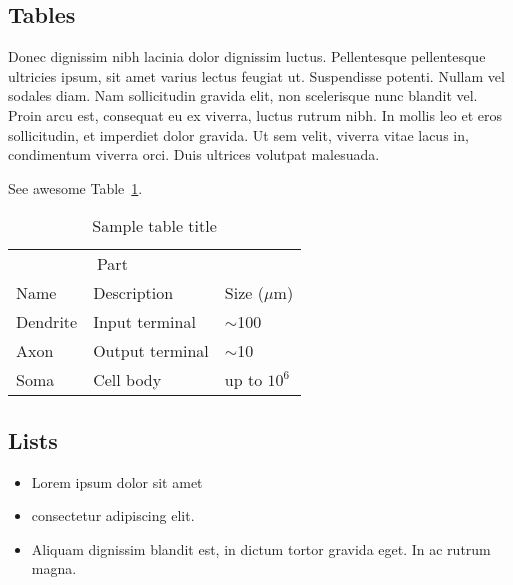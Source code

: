\documentclass{article}
\begin{document}
\subsection{Tables}
Donec dignissim nibh lacinia dolor dignissim luctus. Pellentesque pellentesque ultricies ipsum, sit amet varius lectus feugiat ut. Suspendisse potenti. Nullam vel sodales diam. Nam sollicitudin gravida elit, non scelerisque nunc blandit vel. Proin arcu est, consequat eu ex viverra, luctus rutrum nibh. In mollis leo et eros sollicitudin, et imperdiet dolor gravida. Ut sem velit, viverra vitae lacus in, condimentum viverra orci. Duis ultrices volutpat malesuada. 


See awesome Table~\ref{tab:table}.

\begin{table}
 \caption{Sample table title}
  \centering
  \begin{tabular}{lll}
    \toprule
    \multicolumn{2}{c}{Part}                   \\
    \cmidrule(r){1-2}
    Name     & Description     & Size ($\mu$m) \\
    \midrule
    Dendrite & Input terminal  & $\sim$100     \\
    Axon     & Output terminal & $\sim$10      \\
    Soma     & Cell body       & up to $10^6$  \\
    \bottomrule
  \end{tabular}
  \label{tab:table}
\end{table}

\subsection{Lists}
\begin{itemize}
\item Lorem ipsum dolor sit amet
\item consectetur adipiscing elit. 
\item Aliquam dignissim blandit est, in dictum tortor gravida eget. In ac rutrum magna.
\end{itemize}


  
\end{document}
